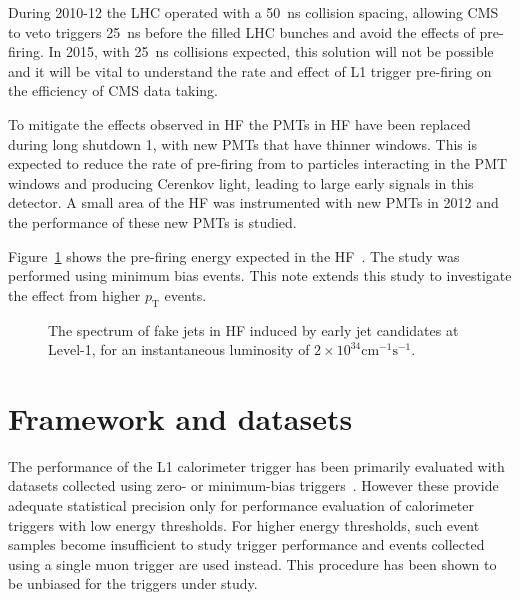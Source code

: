 \documentclass[11pt]{cmspaperpdf}
\newcommand{\pt}{\ensuremath{p_{\mathrm{T}}}\xspace}
\begin{document}
During 2010-12 the LHC operated with a 50~ns collision spacing, allowing CMS to veto triggers 25~ns before the filled LHC bunches and avoid the effects of pre-firing. In 2015, with 25~ns collisions expected, this solution will not be possible and it will be vital to understand the rate and effect of L1 trigger pre-firing on the efficiency of CMS data taking.

To mitigate the effects observed in HF the PMTs in HF have been replaced during long shutdown 1, with new PMTs that have thinner windows. This is expected to reduce the rate of pre-firing from to particles interacting in the PMT windows and producing Cerenkov light, leading to large early signals in this detector. A small area of the HF was instrumented with new PMTs in 2012 and the performance of these new PMTs is studied.

Figure~\ref{fig:hcaltdr_plot} shows the pre-firing energy expected in the HF~\cite{hcaltdr}. The study was performed using minimum bias events. This note extends this study to investigate the effect from higher \pt events.

\vspace{5mm}
\begin{figure}[h!]
\centering
\setlength\fboxsep{0pt}
\setlength\fboxrule{0.2pt}
\caption{The spectrum of fake jets in HF induced by early jet candidates at Level-1, for an instantaneous luminosity of $2 \times 10^{34} \textrm{cm}^{-1} \textrm{s}^{-1}$.}
\label{fig:hcaltdr_plot}
\end{figure}
\vspace{5mm}

\section{Framework and datasets}
\label{sec:tech}

The performance of the L1 calorimeter trigger has been primarily evaluated with datasets collected using zero- or minimum-bias triggers~\cite{2012note}. However these provide adequate statistical precision only for performance evaluation of calorimeter triggers with low energy thresholds. For higher energy thresholds, such event samples become insufficient to study trigger performance and events collected using a single muon trigger are used instead. This procedure has been shown to be unbiased for the triggers under study.
\end{document}
